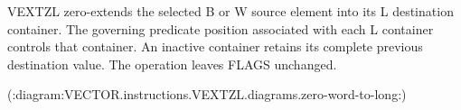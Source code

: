 VEXTZL zero-extends the selected B or W source element into its L destination
container.  The governing predicate position associated with each L container
controls that container.  An inactive container retains its complete previous
destination value.  The operation leaves FLAGS unchanged.

(:diagram:VECTOR.instructions.VEXTZL.diagrams.zero-word-to-long:)
